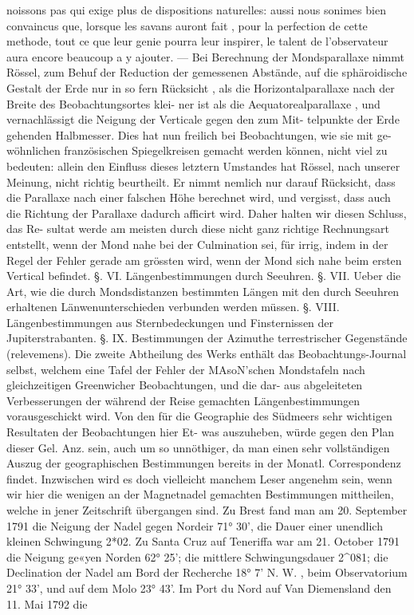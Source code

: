 \documentclass[12pt,a4paper]{article}
\begin{document}
noissons  pas  qui  exige  plus  de  dispositions  naturelles:  aussi  nous  sonimes  bien  convaincus  que,  lorsque les  savans  auront  fait ,  pour  la  perfection  de  cette  methode,  tout  ce  que  leur  genie  pourra  leur  inspirer, le  talent  de  l'observateur  aura  encore  beaucoup  a  y  ajouter.  ---  Bei  Berechnung  der  Mondsparallaxe nimmt  Rössel,  zum  Behuf  der  Reduction  der  gemessenen  Abstände,  auf  die  sphäroidische  Gestalt  der Erde  nur  in  so  fern  Rücksicht ,  als  die  Horizontalparallaxe  nach  der  Breite  des  Beobachtungsortes  klei- ner ist  als  die  Aequatorealparallaxe ,  und  vernachlässigt  die  Neigung  der  Verticale  gegen  den  zum  Mit- telpunkte der  Erde  gehenden  Halbmesser.  Dies  hat  nun  freilich  bei  Beobachtungen,  wie  sie  mit  ge- wöhnlichen französischen  Spiegelkreisen  gemacht  werden  können,  nicht  viel  zu  bedeuten:  allein  den Einfluss  dieses  letztern  Umstandes  hat  Rössel,  nach  unserer  Meinung,  nicht  richtig  beurtheilt.  Er  nimmt nemlich  nur  darauf  Rücksicht,  dass  die  Parallaxe  nach  einer  falschen  Höhe  berechnet  wird,  und  vergisst, dass  auch  die  Richtung  der  Parallaxe  dadurch  afficirt  wird.  Daher  halten  wir  diesen  Schluss,  das  Re- sultat werde  am  meisten  durch  diese  nicht  ganz  richtige  Rechnungsart  entstellt,  wenn  der  Mond  nahe bei  der  Culmination  sei,  für  irrig,  indem  in  der  Regel  der  Fehler  gerade  am  grössten  wird,  wenn  der Mond  sich  nahe  beim  ersten  Vertical  befindet.  §.  VI.  Längenbestimmungen  durch  Seeuhren.  §.  VII. Ueber  die  Art,  wie  die  durch  Mondsdistanzen  bestimmten  Längen  mit  den  durch  Seeuhren  erhaltenen Länwenunterschieden  verbunden  werden  müssen.  §.  VIII.  Längenbestimmungen  aus  Sternbedeckungen und  Finsternissen  der  Jupiterstrabanten.  §.  IX.  Bestimmungen  der  Azimuthe  terrestrischer  Gegenstände (relevemens). Die  zweite  Abtheilung  des  Werks  enthält  das  Beobachtungs-Journal  selbst,  welchem  eine  Tafel der  Fehler  der  MAsoN'schen  Mondstafeln  nach  gleichzeitigen  Greenwicher  Beobachtungen,  und  die  dar- aus abgeleiteten  Verbesserungen  der  während  der  Reise  gemachten  Längenbestimmungen  vorausgeschickt wird.  Von  den  für  die  Geographie  des  Südmeers  sehr  wichtigen  Resultaten  der  Beobachtungen  hier  Et- was auszuheben,  würde  gegen  den  Plan  dieser  Gel.  Anz.  sein,  auch  um  so  unnöthiger,  da  man  einen sehr  vollständigen  Auszug  der  geographischen  Bestimmungen  bereits  in  der  Monatl.  Correspondenz  findet. Inzwischen  wird  es  doch  vielleicht  manchem  Leser  angenehm  sein,  wenn  wir  hier  die  wenigen  an  der Magnetnadel  gemachten  Bestimmungen  mittheilen,  welche  in  jener  Zeitschrift  übergangen  sind.  Zu Brest  fand  man  am  20.  September  1791  die  Neigung  der  Nadel  gegen  Nordeir  71°  30',  die  Dauer  einer unendlich  kleinen  Schwingung  2*02.  Zu  Santa  Cruz  auf  Teneriffa  war  am  21.  October  1791  die  Neigung ge«yen  Norden  62°  25';  die  mittlere  Schwingungsdauer  2\textasciicircum{}081;  die  Declination  der  Nadel  am  Bord  der Recherche  18°  7'  N.  W. ,  beim  Observatorium  21°  33',  und  auf  dem  Molo  23°  43'.  Im  Port  du  Nord  auf Van  Diemensland  den  11.  Mai  1792  die 
\end{document}
